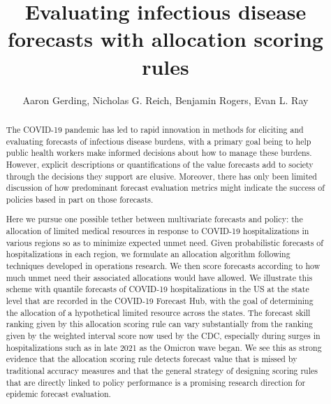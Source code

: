 \documentclass{article}
\title{Evaluating infectious disease forecasts with allocation scoring rules}
\author{Aaron Gerding, Nicholas G. Reich, Benjamin Rogers, Evan L. Ray}
\begin{document}
\newcommand{\del}[2]{\frac{\partial {#1} }{\partial {#2}} }
\newcommand{\dby}[2]{\frac{d {#1} }{d {#2}} }
\newcommand{\sbar}{\overline{s}}
\newtheorem{proposition}{Proposition}

\theoremstyle{remark}
\newtheorem*{remark}{Remark}

\maketitle

\begin{abstract}

The COVID-19 pandemic has led to rapid innovation in methods for eliciting and evaluating forecasts of infectious disease burdens, with a primary goal being to help public health workers make informed decisions about how to manage these burdens. However, explicit descriptions or quantifications of the value forecasts add to society through the decisions they support are elusive.  Moreover, there has only been limited discussion of how predominant forecast evaluation metrics might indicate the success of policies based in part on those forecasts.

Here we pursue one possible tether between multivariate forecasts and policy: the allocation of limited medical resources in response to COVID-19 hospitalizations in various regions so as to minimize expected unmet need. Given probabilistic forecasts of hospitalizations in each region, we formulate an allocation algorithm following techniques developed in operations research. We then score forecasts according to how much unmet need their associated allocations would have allowed. We illustrate this scheme with quantile forecasts of COVID-19 hospitalizations in the US at the state level that are recorded in the COVID-19 Forecast Hub, with the goal of determining the allocation of a hypothetical limited resource across the states. The forecast skill ranking given by this allocation scoring rule can vary substantially from the ranking given by the weighted interval score now used by the CDC, especially during surges in hospitalizations such as in late 2021 as the Omicron wave began. We see this as strong evidence that the allocation scoring rule detects forecast value that is missed by traditional accuracy measures and that the general strategy of designing scoring rules that are directly linked to policy performance is a promising research direction for epidemic forecast evaluation.

\end{abstract}
\end{document}
